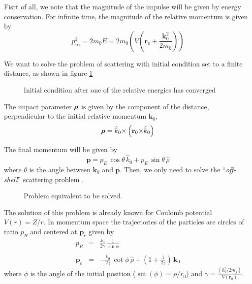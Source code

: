 Fisrt of all, we note that the magnitude of the impulse will be given by energy conservation. For infinite time, the magnitude of the relative momentum is given by
\begin{equation}
  \label{Q:ctmc_magnitude}
p_{\infty}^{2}= 2 m_{0} E = 2 m_{0} \left(V(\bm{r}_{0} + \frac{\bm{k}^{2}_{0}}{2 m_{0}})  \right)
\end{equation}

We want to solve the problem of scattering with initial condition set
to a finite distance, as shown in figure \ref{f:cond-in}

\begin{figure}[h]\label{f:cond-in}
\centering
\caption{Initial condition after one of the relative energies has
converged}
\end{figure}


The impact parameter $\boldsymbol{\rho}$ is given by the component of the distance,
perpendicular to the initial relative momentum $\bm{k}_{0}$,
\begin{equation}\label{Q:rho}
\boldsymbol{\rho} = \hat{k}_{0} {\times} \left( \mathbf{r}_{0} {\times} \hat{k}_{0} \right)
\end{equation}

The final momentum will be given by
\begin{equation}\label{Q:finalmom}
\bm{p} = p_{E} \, \cos{\theta} \, \hat{k}_{0}+ p_{E}\, \sin{\theta}\,
\hat{\rho}
\end{equation}
%
where $\theta $ is the angle between $\bm{k}_{0}$ and $\bm{p}$. Then,
we only need to solve the ``\textit{off-shell}'' scattering problem
\cite{Fiol2000JPBp2847}.

\begin{figure}[!htpb]
  \centering
  \caption{Problem equivalent to be solved.
  \label{f:ctmc1}}
\end{figure}


The solution of this problem is already known for Coulomb potential
$V(r) = Z/r$. In momentum space the trajectories of the particles are
circles of ratio $p_{R}$ and centered at $\bm{p}_{c}$ given by
\begin{eqnarray}\label{Q:circle-mom}
p_{R} &=& \frac{k_{0}}{2 \gamma} \, \frac{1}{\sin{\phi}} \nonumber \\
\\
\bm{p}_{c} &=& - \frac{k_{0}}{2 \gamma } \, \cot{\phi}\, \hat{\rho} +
\left( 1 + \frac{1}{2 \gamma} \right) \, \bm{k}_{0} \nonumber
\end{eqnarray}
where $\phi$ is the angle of the initial position ($\sin(\phi) =
\rho/r_{0}$) and $\displaystyle{\gamma = \frac{\left( k_{0}^{2}/2 m_{j}
\right)}{V(\bm{r}_{0})}}$.

